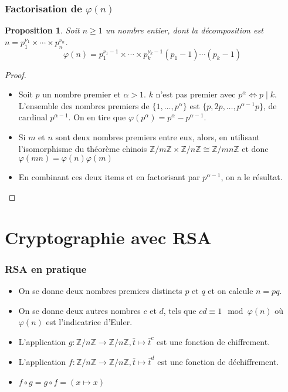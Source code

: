 \documentclass[french]{beamer}
\newtheorem{proposition}{Proposition}
\newcommand{\Z}{\mathbb{Z}}
\begin{document}
\begin{frame}
  \frametitle{Factorisation de $\varphi(n)$}
  \begin{proposition}
    Soit $n \geq 1$ un nombre entier, dont la décomposition est $n =
    p_1^{\nu_1}\times\cdots\times p_n^{\nu_n}$.
    \[ \varphi(n) = p_1^{\nu_1-1}\times\cdots\times p_k^{\nu_k-1}(p_1
    -1) \cdots (p_k - 1) \]
  \end{proposition}
  \begin{proof}
    \begin{itemize}
      \item Soit $p$ un nombre premier et $\alpha >1$. $k$ n'est pas
        premier avec $p^{\alpha} \iff p \mid k$. L'ensemble des nombres
        premiers de $\lbrace 1,\dots,p^{\alpha}\rbrace$ est $\lbrace
        p,2p,\dots,p^{\alpha -1}p\rbrace$, de cardinal $p^{\alpha -1}$.
        On en tire que $\varphi(p^{\alpha}) = p^{\alpha} - p^{\alpha
        -1}$.
      \item Si $m$ et $n$ sont deux nombres premiers entre eux, alors,
        en utilisant l'isomorphisme du théorème chinois $\Z/m\Z\times
        \Z/n\Z \cong \Z/mn\Z$ et donc $\varphi(mn) = \varphi(n)
        \varphi(m)$
      \item En combinant ces deux items et en factorisant par
        $p^{\alpha -1}$, on a le résultat.
    \end{itemize}
  \end{proof}
\end{frame}

\section{Cryptographie avec RSA}

\begin{frame}
  \frametitle{RSA en pratique}
  \begin{itemize}
    \item On se donne deux nombres premiers distincts $p$ et $q$ et on
      calcule $n=pq$.
    \item On se donne deux autres nombres $c$ et $d$, tels que $cd
      \equiv 1 \mod \varphi(n)$ où $\varphi(n)$ est l'indicatrice
      d'Euler.
    \item L'application $g:\Z/n\Z\to\Z/n\Z, \bar{t} \mapsto \bar{t}^c$
      est une fonction de chiffrement.
    \item L'application $f:\Z/n\Z\to\Z/n\Z, \bar{t} \mapsto \bar{t}^d$
      est une fonction de déchiffrement.
    \item $f\circ g = g\circ f = (x\mapsto x)$
  \end{itemize}
\end{frame}
\end{document}
